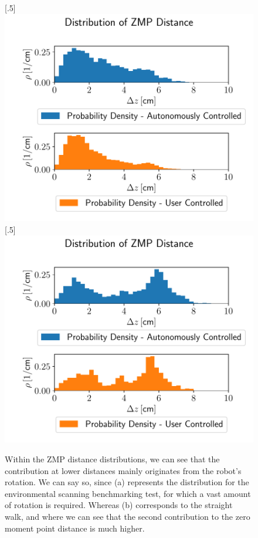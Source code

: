 \begin{figure}[h!] 
	[.5\linewidth]{\includegraphics[scale=.45]{chapters/11_autonomous_walking_experiments/img/zmp_distribution_sight.pdf}}
	[.5\linewidth]{\includegraphics[scale=.45]{chapters/11_autonomous_walking_experiments/img/zmp_distribution_straight.pdf}}
	\caption{Within the ZMP distance distributions, we can see that the contribution at lower distances mainly originates from the robot's rotation. We can say so, since (a) represents the distribution for the environmental scanning benchmarking test, for which a vast amount of rotation is required. Whereas (b) corresponds to the straight walk, and where we can see that the second contribution to the zero moment point distance is much higher.}
	\label{fig::424_aw_zmp_dist_split}
\end{figure} 
